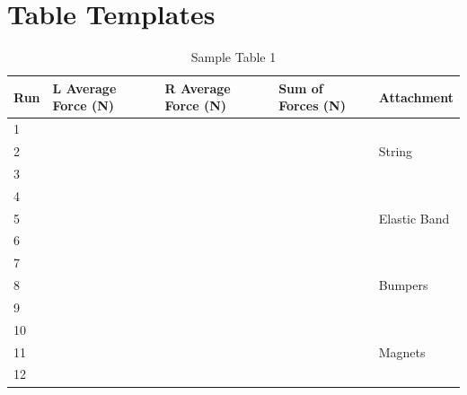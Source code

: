 \section{Table Templates}
%
\begin{table}[ht!]
    \begin{center}
        \begin{tabular}{l|l|l|l|l}
            \textbf{Run} & \textbf{L Average Force} (N) & \textbf{R Average Force} (N) & \textbf{Sum of Forces} (N) & \textbf{Attachment} \\
            \hline
            1 & & & & \\
            2 & & & & String \\
            3 & & & & \\
            \hline
            4 & & & & \\
            5 & & & & Elastic Band \\
            6 & & & & \\
            \hline
            7 & & & & \\
            8 & & & & Bumpers \\
            9 & & & & \\
            \hline
            10 & & & & \\
            11 & & & & Magnets \\
            12 & & & & \\
            \hline
        \end{tabular}
    \end{center}
    \caption{Sample Table 1}
\end{table}
%
\newpage
